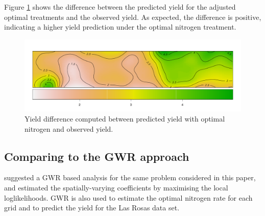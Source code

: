 \documentclass[a4paper]{article}   	%
\begin{document}
	

 Figure \ref{fig:stdiff} shows the difference between the predicted yield for the adjusted optimal treatments and the observed yield. As expected, the difference is positive, indicating a higher yield prediction under the optimal nitrogen treatment. 	
	
	\begin{figure}[!htp]
		\centering	
		\includegraphics[width=\textwidth]{Images/ST_DiffYield}
		\caption{Yield difference computed between predicted yield with optimal nitrogen and observed yield.}\label{fig:stdiff}
	\end{figure}
	
	
	\subsection{Comparing to the GWR approach}\label{sec:comparegwr}
	
	\textcite{Rakshit2020Novel} suggested a GWR based analysis for the same problem considered in this paper, and estimated the spatially-varying coefficients by maximising the local loglikelihoods. GWR is also used to estimate the optimal nitrogen rate for each grid and to predict the yield for the Las Rosas data set. 
	
	
	
\end{document}
